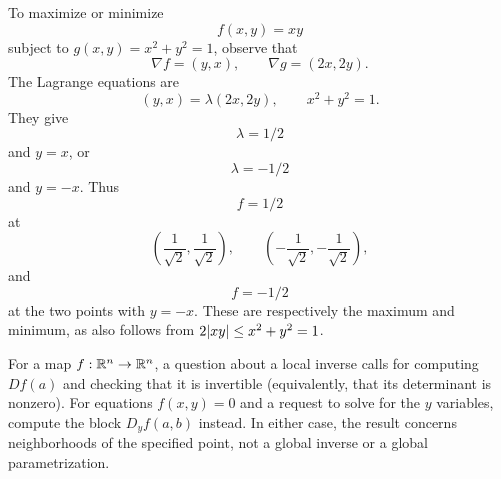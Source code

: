 \begin{example}
To maximize or minimize
\[
f(x,y)=xy
\]
subject to $g(x,y)=x^2+y^2=1$, observe that
\[
\nabla f=(y,x),
\qquad
\nabla g=(2x,2y).
\]
The Lagrange equations are
\[
(y,x)=\lambda(2x,2y),
\qquad x^2+y^2=1.
\]
They give
\[
\lambda=1/2
\]
 and $y=x$, or
\[
\lambda=-1/2
\]
 and $y=-x$.
Thus
\[
f=1/2
\]
 at
\[
\left(\frac1{\sqrt2},\frac1{\sqrt2}\right),
\qquad
\left(-\frac1{\sqrt2},-\frac1{\sqrt2}\right),
\]
and
\[
f=-1/2
\]
 at the two points with $y=-x$.  These are respectively the
maximum and minimum, as also follows from $2\lvert xy\rvert\leq x^2+y^2=1$.
\end{example}

\begin{remark}
For a map $f:\mathbb{R}^n\to\mathbb{R}^n$, a question about a local inverse calls for
computing $Df(a)$ and checking that it is invertible (equivalently, that its
determinant is nonzero).  For equations $f(x,y)=0$ and a request to solve for
the $y$ variables, compute the block $D_yf(a,b)$ instead.  In either case,
the result concerns neighborhoods of the specified point, not a global
inverse or a global parametrization.
\end{remark}


